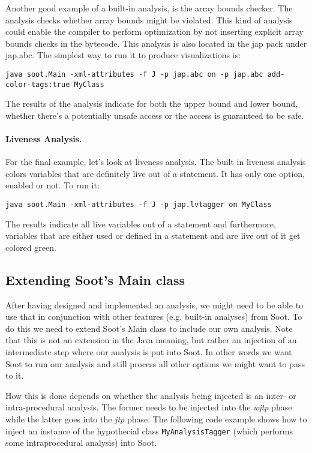 \documentclass{article}
\newcommand{\code}[1]{\texttt{\small #1}}
\begin{document}
Another good example of a built-in analysis, is the array bounds
checker. The analysis checks whether array bounds might be
violated. This kind of analysis could enable the compiler to perform
optimization by not inserting explicit array bounds checks in the
bytecode. This analysis is also located in the jap pack under
jap.abc. The simplest way to run it to produce visualizations is:
\begin{center}
  \code{java soot.Main -xml-attributes -f J -p jap.abc on -p jap.abc
  add-color-tags:true MyClass}
\end{center}
The results of the analysis indicate for both the upper bound and
lower bound, whether there's a potentially unsafe access or the access
is guaranteed to be safe.

\paragraph{Liveness Analysis.}

For the final example, let's look at liveness analysis. The built in
liveness analysis colors variables that are definitely live out of a
statement. It has only one option, enabled or not. To run it:
\begin{center}
  \code{java soot.Main -xml-attributes -f J -p jap.lvtagger on MyClass}
\end{center}
The results indicate all live variables out of a statement and
furthermore, variables that are either used or defined in a statement
and are live out of it get colored green.

\subsection{Extending Soot's Main class}

After having designed and implemented an analysis, we might need to be
able to use that in conjunction with other features (e.g. built-in
analyses) from Soot. To do this we need to extend Soot's Main class to
include our own analysis. Note that this is not an extension in the
Java meaning, but rather an injection of an intermediate step where
our analysis is put into Soot. In other words we want Soot to run our
analysis and still process all other options we might want to pass to
it.

How this is done depends on whether the analysis being injected is an
inter- or intra-procedural analysis. The former needs to be injected
into the \emph{wjtp} phase while the latter goes into the \emph{jtp}
phase. The following code example shows how to inject an instance of
the hypothecial class \code{MyAnalysisTagger} (which performs some
intraprocedural analysis) into Soot.
\end{document}
